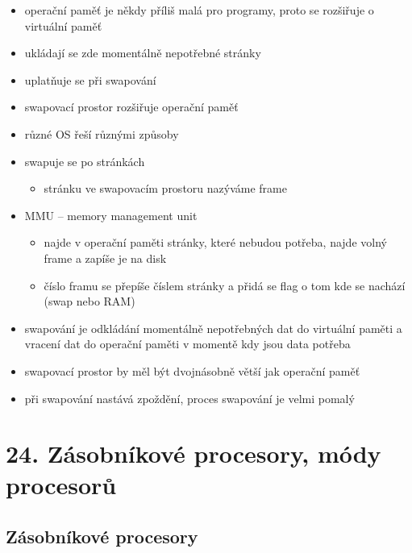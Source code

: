 \documentclass[a4paper,12pt]{article}
\providecommand{\tightlist}{%
\setlength{\itemsep}{0pt}\setlength{\parskip}{0pt}}
\begin{document}
\begin{itemize}
\tightlist
\item operační paměť je někdy příliš malá pro programy, proto se rozšiřuje o
  virtuální paměť
\item ukládají se zde momentálně nepotřebné stránky
\item uplatňuje se při swapování
\item swapovací prostor rozšiřuje operační paměť
\item různé OS řeší různými způsoby
\item swapuje se po stránkách

  \begin{itemize}
  \tightlist
  \item stránku ve swapovacím prostoru nazýváme frame
  \end{itemize}
\item MMU -- memory management unit

  \begin{itemize}
  \tightlist
  \item najde v operační paměti stránky, které nebudou potřeba, najde volný
    frame a zapíše je na disk
  \item číslo framu se přepíše číslem stránky a přidá se flag o tom kde se
    nachází (swap nebo RAM)
  \end{itemize}
\item swapování je odkládání momentálně nepotřebných dat do virtuální paměti
  a vracení dat do operační paměti v momentě kdy jsou data potřeba
\item swapovací prostor by měl být dvojnásobně větší jak operační paměť
\item při swapování nastává zpoždění, proces swapování je velmi pomalý
\end{itemize}

\section{24. Zásobníkové procesory, módy procesorů}

\subsection{Zásobníkové procesory}
\end{document}
